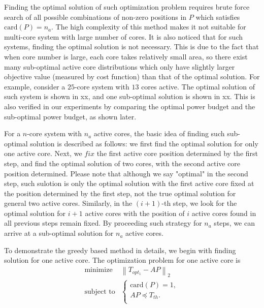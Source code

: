 Finding the optimal solution of such optimization problem requires brute force search of all possible combinations of non-zero positions in $P$ which satisfies $\text{card}(P)=n_{a}$. The high complexity of this method makes it not suitable for multi-core system with large number of cores. It is also noticed that for such systems, finding the optimal solution is not necessary. This is due to the fact that when core number is large, each core takes relatively small area, so there exist many sub-optimal active core distributions which only have slightly larger objective value (measured by cost function) than that of the optimal solution. For example, consider a $25$-core system with $13$ cores active. The optimal solution of such system is shown in xx, and one sub-optimal solution is shown in xx. This is also verified in our experiments by comparing the optimal power budget and the sub-optimal power budget, as shown later.

For a $n$-core system with $n_{a}$ active cores, the basic idea of finding such sub-optimal solution is described as follows: we first find the optimal solution for only one active core. Next, we $fix$ the first active core position determined by the first step, and find the optimal solution of two cores, with the second active core position determined. Please note that although we say "optimal" in the second step, such sulotion is only the optimal solution with the first active core fixed at the position determined by the first step, not the true optimal solution for general two active cores. Similarly, in the $(i+1)$-th step, we look for the optimal solution for $i+1$ active cores with the position of $i$ active cores found in all previous steps remain fixed. By proceeding such strategy for $n_{a}$ steps, we can arrive at a sub-optimal solution for $n_{a}$ active cores.


To demonstrate the greedy based method in details, we begin with finding solution for one active core. The optimization problem for one active core is
\begin{equation}\label{eq:1_sim_opt_topt}
\begin{split}
\text{minimize } &  \left \| T_{opt_1} - AP \right \|_{2}\\
\text{subject to} &\left\{
\begin{array}{lr}
\text{card}(P) = 1,\\
AP \preceq T_{th}.\\
\end{array}
\right.
\end{split}
\end{equation}


